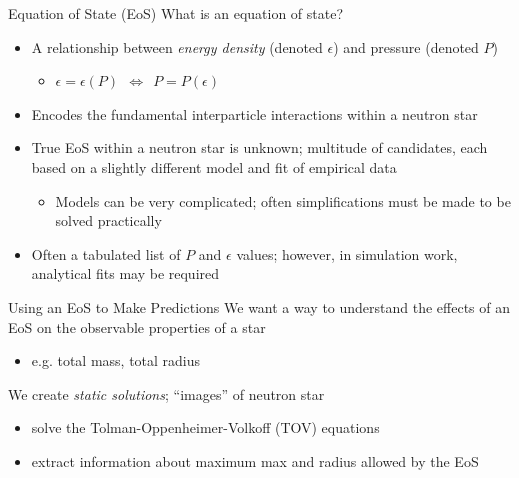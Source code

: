 \documentclass[handout]{beamer}
\begin{document}
    \begin{frame}{Equation of State (EoS)}
        What is an equation of state? \pause
        \begin{itemize}
            \item A relationship between \textit{energy density} (denoted $\epsilon$) \pause and pressure (denoted $P$) \pause \begin{itemize}
                \item $\epsilon = \epsilon (P)$\pause $~~ \Leftrightarrow ~~  P = P(\epsilon)$ \pause
            \end{itemize}
            \item Encodes the fundamental interparticle interactions within a neutron star \pause
            \item True EoS within a neutron star is unknown; \pause multitude of candidates, each based on a slightly different model and fit of empirical data \pause \begin{itemize}
                \item Models can be very complicated\pause ; often simplifications must be made to be solved practically \pause
            \end{itemize}
            \item Often a tabulated list of $P$ and $\epsilon$ values; \pause however, in simulation work, analytical fits may be required
        \end{itemize}
    \end{frame}


    \begin{frame}{Using an EoS to Make Predictions}
        We want a way to understand the effects of an EoS on the observable properties of a star
        \begin{itemize}
            \item e.g. total mass, total radius
        \end{itemize}
        We create \textit{static solutions}; ``images'' of neutron star
        \begin{itemize}
            \item solve the Tolman-Oppenheimer-Volkoff (TOV) equations
            \item extract information about maximum max and radius allowed by the EoS
        \end{itemize}
    \end{frame}
\end{document}
